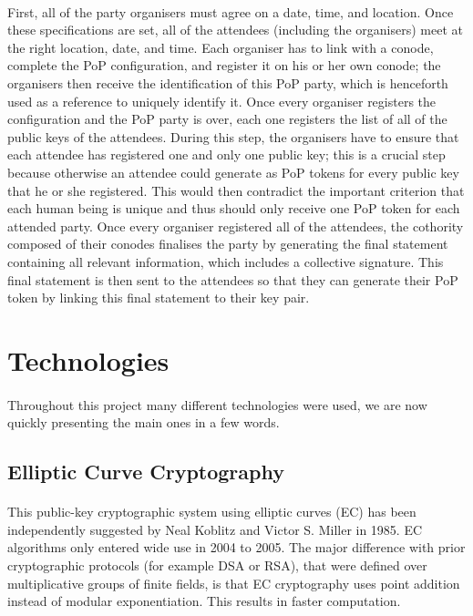 \paragraph{}
First, all of the party organisers must agree on a date, time, and location. Once these specifications are set, all of the attendees (including the organisers) meet at the right location, date, and time. Each organiser has to link with a conode, complete the PoP configuration, and register it on his or her own conode; the organisers then receive the identification of this PoP party, which is henceforth used as a reference to uniquely identify it. Once every organiser registers the configuration and the PoP party is over, each one registers the list of all of the public keys of the attendees. During this step, the organisers have to ensure that each attendee has registered one and only one public key; this is a crucial step because otherwise an attendee could generate as PoP tokens for every public key that he or she registered. This would then contradict the important criterion that each human being is unique and thus should only receive one PoP token for each attended party. Once every organiser registered all of the attendees, the cothority composed of their conodes finalises the party by generating the final statement containing all relevant information, which includes a collective signature. This final statement is then sent to the attendees so that they can generate their PoP token by linking this final statement to their key pair.

\section{Technologies}

\paragraph{}
Throughout this project many different technologies were used, we are now quickly presenting the main ones in a few words.

\subsection[Elliptic Curve Cryptography]{Elliptic Curve Cryptography\raisebox{.3\baselineskip}{\normalsize\footnotemark}}

\paragraph{}
This public-key cryptographic system using elliptic curves (EC) has been independently suggested by Neal Koblitz and Victor S. Miller in 1985. EC algorithms only entered wide use in 2004 to 2005. The major difference with prior cryptographic protocols (for example DSA or RSA), that were defined over multiplicative groups of finite fields, is that EC cryptography uses point addition instead of modular exponentiation. This results in faster computation.

